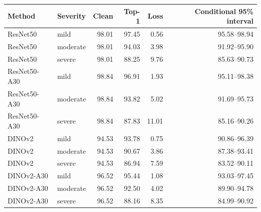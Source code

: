 \begin{tabular}{llrrrr}
\toprule
Method & Severity & Clean & Top-1 & Loss & Conditional 95\% interval \\
\midrule
ResNet50 & mild & 98.01 & 97.45 & 0.56 & 95.58--98.94 \\
ResNet50 & moderate & 98.01 & 94.03 & 3.98 & 91.92--95.90 \\
ResNet50 & severe & 98.01 & 88.25 & 9.76 & 85.63--90.73 \\
ResNet50-A30 & mild & 98.84 & 96.91 & 1.93 & 95.11--98.38 \\
ResNet50-A30 & moderate & 98.84 & 93.82 & 5.02 & 91.69--95.73 \\
ResNet50-A30 & severe & 98.84 & 87.83 & 11.01 & 85.16--90.26 \\
DINOv2 & mild & 94.53 & 93.78 & 0.75 & 90.86--96.39 \\
DINOv2 & moderate & 94.53 & 90.67 & 3.86 & 87.38--93.41 \\
DINOv2 & severe & 94.53 & 86.94 & 7.59 & 83.52--90.11 \\
DINOv2-A30 & mild & 96.52 & 95.44 & 1.08 & 93.03--97.45 \\
DINOv2-A30 & moderate & 96.52 & 92.50 & 4.02 & 89.90--94.78 \\
DINOv2-A30 & severe & 96.52 & 88.16 & 8.35 & 84.99--90.92 \\
\bottomrule
\end{tabular}
